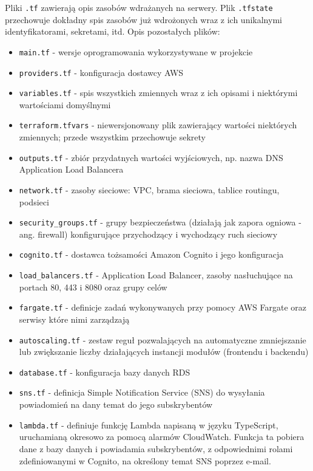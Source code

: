\documentclass[../../main.tex]{subfiles}
\begin{document}
        Pliki \texttt{.tf} zawierają opis zasobów wdrażanych na serwery. Plik \texttt{.tfstate} przechowuje dokładny spis zasobów już wdrożonych wraz z ich unikalnymi identyfikatorami, sekretami, itd. Opis pozostałych plików:
        \begin{itemize}
            \item \texttt{main.tf} - wersje oprogramowania wykorzystywane w projekcie
            \item \texttt{providers.tf} - konfiguracja dostawcy AWS
            \item \texttt{variables.tf} - spis wszystkich zmiennych wraz z ich opisami i niektórymi wartościami domyślnymi
            \item \texttt{terraform.tfvars} - niewersjonowany plik zawierający wartości niektórych zmiennych; przede wszystkim przechowuje sekrety
            \item \texttt{outputs.tf} - zbiór przydatnych wartości wyjściowych, np. nazwa DNS Application Load Balancera
            \item \texttt{network.tf} - zasoby sieciowe: VPC, brama sieciowa, tablice routingu, podsieci
            \item \texttt{security\_groups.tf} - grupy bezpieczeństwa (działają jak zapora ogniowa - ang. firewall) konfigurujące przychodzący i wychodzący ruch sieciowy
            \item \texttt{cognito.tf} - dostawca tożsamości Amazon Cognito i jego konfiguracja
            \item \texttt{load\_balancers.tf} - Application Load Balancer, zasoby nasłuchujące na portach 80, 443 i 8080 oraz grupy celów
            \item \texttt{fargate.tf} - definicje zadań wykonywanych przy pomocy AWS Fargate oraz serwisy które nimi zarządzają
            \item \texttt{autoscaling.tf} - zestaw reguł pozwalających na automatyczne zmniejszanie lub zwiększanie liczby działających instancji modułów (frontendu i backendu)
            \item \texttt{database.tf} - konfiguracja bazy danych RDS
            \item \texttt{sns.tf} - definicja Simple Notification Service (SNS) do wysyłania powiadomień na dany temat do jego subskrybentów
            \item \texttt{lambda.tf} - definiuje funkcję Lambda napisaną w języku TypeScript, uruchamianą okresowo za pomocą alarmów CloudWatch. Funkcja ta pobiera dane z bazy danych i powiadamia subskrybentów, z odpowiednimi rolami zdefiniowanymi w Cognito, na określony temat SNS poprzez e-mail.
        \end{itemize}
\end{document}

